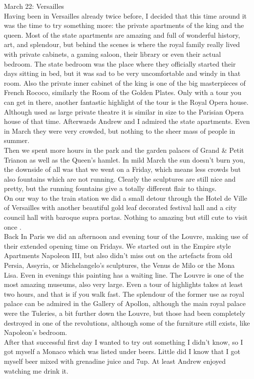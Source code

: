 March 22: Versailles\\
Having been in Versailles already twice before, I decided that this time around it was the time to try something more: the private apartments of the king and the queen. Most of the state apartments are amazing and full of wonderful history, art, and splendour, but behind the scenes is where the royal family really lived with private cabinets, a gaming saloon, their library or even their actual bedroom. The state bedroom was the place where they officially started their days sitting in bed, but it was sad to be very uncomfortable and windy in that room. Also the private inner cabinet of the king is one of the big masterpieces of French Rococo, similarly the Room of the Golden Plates. Only with a tour you can get in there, another fantastic highlight of the tour is the Royal Opera house. Although used as large private theatre it is similar in size to the Parisian Opera house of that time. Afterwards Andrew and I admired the state apartments. Even in March they were very crowded, but nothing to the sheer mass of people in summer. \\
Then we spent more hours in the park and the garden palaces of Grand \& Petit Trianon as well as the Queen's hamlet. In mild March the sun doesn't burn you, the downside of all was that we went on a Friday, which means less crowds but also fountains which are not running. Clearly the sculptures are still nice and pretty, but the running fountains give a totally different flair to things.\\
On our way to the train station we did a small detour through the Hotel de Ville of Versailles with another beautiful gold leaf decorated festival hall and a city council hall with baroque supra portas. Nothing to amazing but still cute to visit once .\\
Back In Paris we did an afternoon and evening tour of the Louvre, making use of their extended opening time on Fridays. We started out in the Empire style Apartments Napoleon III, but also didn't miss out on the artefacts from old Persia, Assyria, or Michelangelo's sculptures, the Venus de Milo or the Mona Lisa. Even in evenings this painting has a waiting line. The Louvre is one of the most amazing museums, also very large. Even a tour of highlights takes at least two hours, and that is if you walk fast. The splendour of the former use as royal palace can be admired in the Gallery of Apollon, although the main royal palace were the Tuleries, a bit further down the Louvre, but those had been completely destroyed in one of the revolutions, although some of the furniture still exists, like Napoleon's bedroom.\\
After that successful first day I wanted to try out something I didn't know, so I got myself a Monaco which was listed under beers. Little did I know that I got myself beer mixed with grenadine juice and 7up. At least Andrew enjoyed watching me drink it.\\

